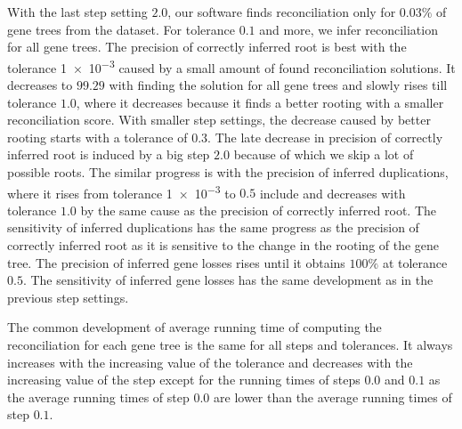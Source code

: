 With the last step setting $2.0$, our software finds reconciliation only for $0.03\%$ of gene trees from the dataset. For tolerance $0.1$ and more, we infer reconciliation for all gene trees. The precision of correctly inferred root is best with the tolerance \num{1e-3} caused by a small amount of found reconciliation solutions. It decreases to $99.29$ with finding the solution for all gene trees and slowly rises till tolerance $1.0$, where it decreases because it finds a better rooting with a smaller reconciliation score. With smaller step settings, the decrease caused by better rooting starts with a tolerance of $0.3$. The late decrease in precision of correctly inferred root is induced by a big step $2.0$ because of which we skip a lot of possible roots. The similar progress is with the precision of inferred duplications, where it rises from tolerance \num{1e-3} to $0.5$ include and decreases with tolerance $1.0$ by the same cause as the precision of correctly inferred root. The sensitivity of inferred duplications has the same progress as the precision of correctly inferred root as it is sensitive to the change in the rooting of the gene tree. The precision of inferred gene losses rises until it obtains $100\%$ at tolerance $0.5$. The sensitivity of inferred gene losses has the same development as in the previous step settings.

The common development of average running time of computing the reconciliation for each gene tree is the same for all steps and tolerances. It always increases with the increasing value of the tolerance and decreases with the increasing value of the step except for the running times of steps $0.0$ and $0.1$ as the average running times of step $0.0$ are lower than the average running times of step $0.1$.


